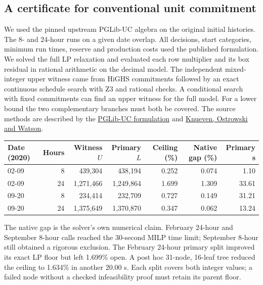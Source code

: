 \documentclass[10pt,letterpaper]{article}
\begin{document}
\subsection{A certificate for conventional unit commitment}
We used the pinned upstream PGLib-UC algebra on the original initial histories. The 8- and 24-hour runs on a given date overlap. All decisions, start categories, minimum run times, reserve and production costs used the published formulation. We solved the full LP relaxation and evaluated each row multiplier and its box residual in rational arithmetic on the decimal model. The independent mixed-integer upper witness came from HiGHS commitments followed by an exact continuous schedule search with Z3 and rational checks. A conditional search with fixed commitments can find an upper witness for the full model. For a lower bound the two complementary branches must both be covered. The source methods are described by the \href{https://github.com/power-grid-lib/pglib-uc/blob/39a7f38cf4703de92f0291f0c873c2e98c789301/MODEL.tex}{PGLib-UC formulation} and \href{https://doi.org/10.1287/ijoc.2019.0944}{Knueven, Ostrowski and Watson}.

\begin{center}\small\begin{tabular}{lrrrrrr}\toprule
Date (2020) & Hours & Witness $U$ & Primary $L$ & Ceiling (\%) & Native gap (\%) & Primary s\\\midrule
02-09 & 8 & 439,304 & 438,194 & 0.252 & 0.074 & 1.10\\
02-09 & 24 & 1,271,466 & 1,249,864 & 1.699 & 1.309 & 33.61\\
09-20 & 8 & 234,414 & 232,709 & 0.727 & 0.149 & 31.21\\
09-20 & 24 & 1,375,649 & 1,370,870 & 0.347 & 0.062 & 13.24\\
\bottomrule\end{tabular}\end{center}
The native gap is the solver's own numerical claim. February 24-hour and September 8-hour calls reached the 30-second MILP time limit; September 8-hour still obtained a rigorous exclusion. The February 24-hour primary split improved its exact LP floor but left 1.699\% open. A post hoc 31-node, 16-leaf tree reduced the ceiling to 1.634\% in another 20.00 s. Each split covers both integer values; a failed node without a checked infeasibility proof must retain its parent floor.
\end{document}
